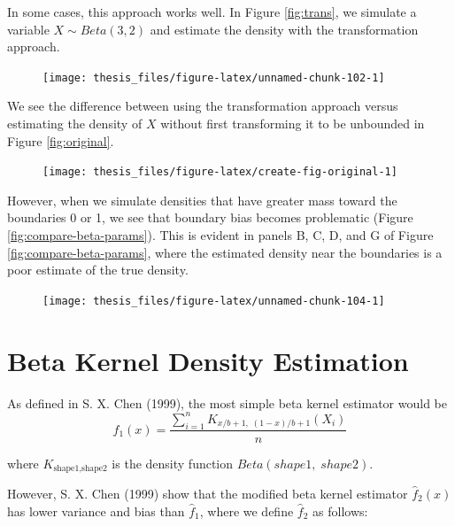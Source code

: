 \documentclass[12pt,twoside]{smiththesis}
\begin{document}
In some cases, this approach works well. In Figure \ref{fig:trans}, we simulate a variable \(X \sim Beta(3,2)\) and estimate the density with the transformation approach.
\begin{figure}

{\centering \texttt{[image: thesis\_files/figure-latex/unnamed-chunk-102-1]} 

}

\caption{\label{fig:trans}}\label{fig:unnamed-chunk-102}
\end{figure}
We see the difference between using the transformation approach versus estimating the density of \(X\) without first transforming it to be unbounded in Figure \ref{fig:original}.
\begin{figure}

{\centering \texttt{[image: thesis\_files/figure-latex/create-fig-original-1]} 

}

\caption{\label{fig:original}}\label{fig:create-fig-original}
\end{figure}
However, when we simulate densities that have greater mass toward the boundaries 0 or 1, we see that boundary bias becomes problematic (Figure \ref{fig:compare-beta-params}). This is evident in panels B, C, D, and G of Figure \ref{fig:compare-beta-params}, where the estimated density near the boundaries is a poor estimate of the true density.
\begin{figure}

{\centering \texttt{[image: thesis\_files/figure-latex/unnamed-chunk-104-1]} 

}

\caption{\label{fig:compare-beta-params}}\label{fig:unnamed-chunk-104}
\end{figure}
\newpage

\hypertarget{betakernel}{%
\section{Beta Kernel Density Estimation}\label{betakernel}}

As defined in S. X. Chen (1999), the most simple beta kernel estimator would be
\[\hat f_1(x) = \dfrac{\sum_{i=1}^n K_{x/b + 1, \; (1-x)/b + 1} (X_i)}{n}\]

where \(K_{\text{shape1}, \text{shape2}}\) is the density function \(Beta(shape1, \; shape2)\).

However, S. X. Chen (1999) show that the modified beta kernel estimator \(\hat f_2(x)\) has lower variance and bias than \(\hat f_1\), where we define \(\hat f_2\) as follows:
\end{document}

